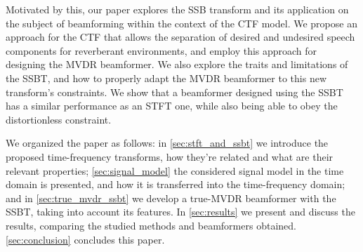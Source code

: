 Motivated by this, our paper explores the SSB transform and its application on the subject of beamforming within the context of the CTF model. We propose an approach for the CTF that allows the separation of desired and undesired speech components for reverberant environments, and employ this approach for designing the MVDR beamformer. We also explore the traits and limitations of the SSBT, and how to properly adapt the MVDR beamformer to this new transform's constraints. {\color{red}We show that a beamformer designed using the SSBT has a similar performance as an STFT one, while also being able to obey the distortionless constraint.}

We organized the paper as follows:
in \cref{sec:stft_and_ssbt} we introduce the proposed time-frequency transforms, how they're related and what are their relevant properties;
\cref{sec:signal_model} the considered signal model in the time domain is presented, and how it is transferred into the time-frequency domain;
and in \cref{sec:true_mvdr_ssbt} we develop a true-MVDR beamformer with the SSBT, taking into account its features.
In \cref{sec:results} we present and discuss the results, comparing the studied methods and beamformers obtained.
\cref{sec:conclusion} concludes this paper.